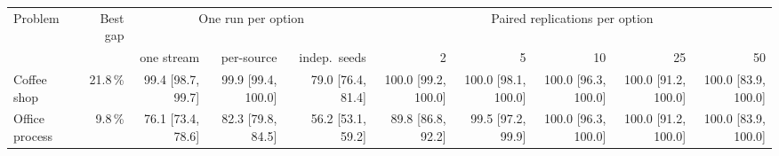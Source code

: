 \begin{tabular}{lrrrrrrrrr}
\toprule
Problem & Best gap & \multicolumn{3}{c}{One run per option} & \multicolumn{5}{c}{Paired replications per option} \\
 & & one stream & per-source & indep.\ seeds & 2 & 5 & 10 & 25 & 50 \\
\midrule
Coffee shop & 21.8\,\% & 99.4 [98.7, 99.7] & 99.9 [99.4, 100.0] & 79.0 [76.4, 81.4] & 100.0 [99.2, 100.0] & 100.0 [98.1, 100.0] & 100.0 [96.3, 100.0] & 100.0 [91.2, 100.0] & 100.0 [83.9, 100.0] \\
Office process & 9.8\,\% & 76.1 [73.4, 78.6] & 82.3 [79.8, 84.5] & 56.2 [53.1, 59.2] & 89.8 [86.8, 92.2] & 99.5 [97.2, 99.9] & 100.0 [96.3, 100.0] & 100.0 [91.2, 100.0] & 100.0 [83.9, 100.0] \\
\bottomrule
\end{tabular}
